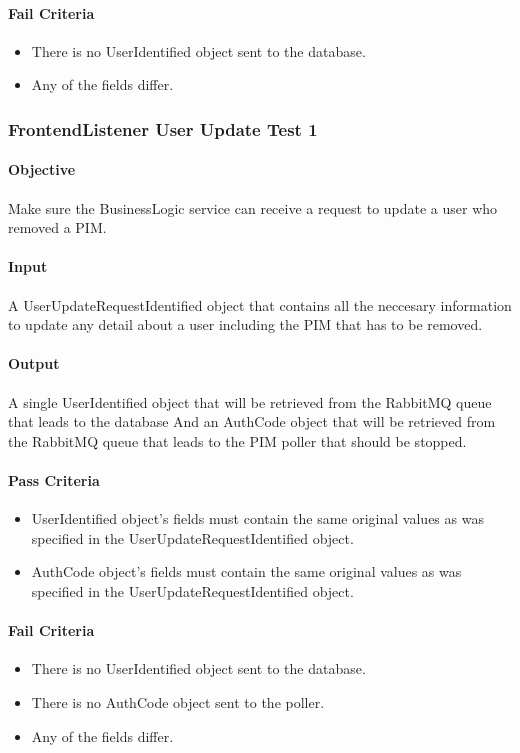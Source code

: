 \documentclass[hidelinks,english]{article}
\begin{document}
				\paragraph{Fail Criteria}
				\begin{itemize}
					\item There is no UserIdentified object sent to the database.
					\item Any of the fields differ.
				\end{itemize}
			
			\subsubsection{FrontendListener User Update Test 1}\label{businessfrontendlistenerupdatetest1}
				\paragraph{Objective} Make sure the BusinessLogic service can receive a request to update a user who removed a PIM.
				\paragraph{Input} A UserUpdateRequestIdentified object that contains all the neccesary information to update any detail about a user including the PIM that has to be removed.
				\paragraph{Output} A single UserIdentified object that will be retrieved from the RabbitMQ queue that leads to the database And an AuthCode object that  will be retrieved from the RabbitMQ queue that leads to the PIM poller that should be stopped.
				\paragraph{Pass Criteria}
				\begin{itemize}
					\item UserIdentified object's fields must contain the same original values as was specified in the UserUpdateRequestIdentified object.
					\item AuthCode object's fields must contain the same original values as was specified in the UserUpdateRequestIdentified object.
				\end{itemize}
				\paragraph{Fail Criteria}
				\begin{itemize}
					\item There is no UserIdentified object sent to the database.
					\item There is no AuthCode object sent to the poller.
					\item Any of the fields differ.
				\end{itemize}
			
\end{document}
